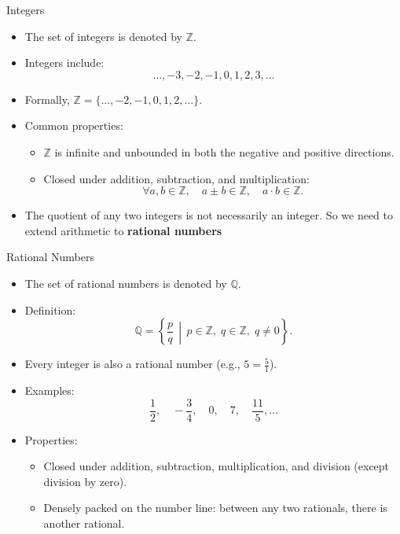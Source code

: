   \begin{frame}{Integers}
    \begin{itemize}
        \item The set of integers is denoted by \(\mathbb{Z}\).
        \item Integers include:
        \[
          \ldots, -3, -2, -1, 0, 1, 2, 3, \ldots
        \]
        \item Formally, \(\mathbb{Z} = \{\dots, -2, -1, 0, 1, 2, \dots\}\).
        \item Common properties:
        \begin{itemize}
            \item \(\mathbb{Z}\) is infinite and unbounded in both the negative and positive directions.
            \item Closed under addition, subtraction, and multiplication:
                \[
                  \forall a, b \in \mathbb{Z}, \quad
                  a \pm b \in \mathbb{Z}, \quad
                  a \cdot b \in \mathbb{Z}.
                \]
        \end{itemize}
        \item The quotient of any two integers is not necessarily an integer. So we need to extend arithmetic to \textbf{rational numbers}
    \end{itemize}
\end{frame}
\begin{frame}{Rational Numbers}
    \begin{itemize}
        \item The set of rational numbers is denoted by \(\mathbb{Q}\).
        \item Definition:
        \[
          \mathbb{Q} = \left\{ \frac{p}{q} \,\middle|\,
            p \in \mathbb{Z}, \; q \in \mathbb{Z}, \; q \neq 0
          \right\}.
        \]
        \item Every integer is also a rational number (e.g., \(5 = \frac{5}{1}\)).
        \item Examples:
        \[
          \frac{1}{2}, \quad -\frac{3}{4}, \quad 0, \quad 7, \quad \frac{11}{5}, \ldots
        \]
        \item Properties:
        \begin{itemize}
            \item Closed under addition, subtraction, multiplication, and division (except division by zero).
            \item Densely packed on the number line: between any two rationals, there is another rational.
        \end{itemize}
    \end{itemize}
\end{frame}

